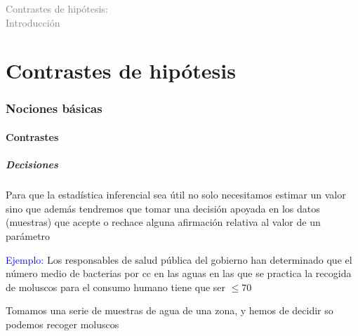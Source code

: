 \documentclass[12pt,t]{beamer}\usepackage[]{graphicx}\usepackage[]{color}
\title[\red{Matemáticas III GINF}]{}
\author[]{}
\date{}
\newcommand{\blue}[1]{\textcolor{blue}{#1}}
\newcommand{\gray}[1]{\textcolor{gray}{#1}}
\renewcommand{\emph}[1]{{\color{red}#1}}
\renewcommand{\leq}{\leqslant}
\theoremstyle{plain}
\theoremstyle{definition}
\begin{document}
\beamertemplatedotitem

\lstset{breaklines=true}
\lstset{basicstyle=\ttfamily}

\begin{frame}
\vfill
\begin{center}
\gray{\LARGE Contrastes de hipótesis:}\\[1ex]

\gray{\LARGE Introducción}
\end{center}
\vfill
\end{frame}




 


\part{Contrastes de hipótesis}
% 

\section{Nociones básicas}
\subsection{Contrastes}
\begin{frame}

\frametitle{Decisiones}

Para que la estadística inferencial sea útil no solo necesitamos estimar un valor sino que además tendremos que tomar una \emph{decisión} apoyada en los datos (muestras) que acepte o rechace alguna afirmación relativa 
al valor de un parámetro 
\bigskip

{\blue{Ejemplo:}
Los  responsables de salud pública  del gobierno han determinado que el número medio de bacterias por cc en las aguas  en las que se practica la recogida de moluscos para el consumo humano tiene que ser $\leq 70$
\medskip

Tomamos una serie de muestras de agua de una zona, y hemos de decidir so podemos recoger moluscos}
\end{frame}
\end{document}
